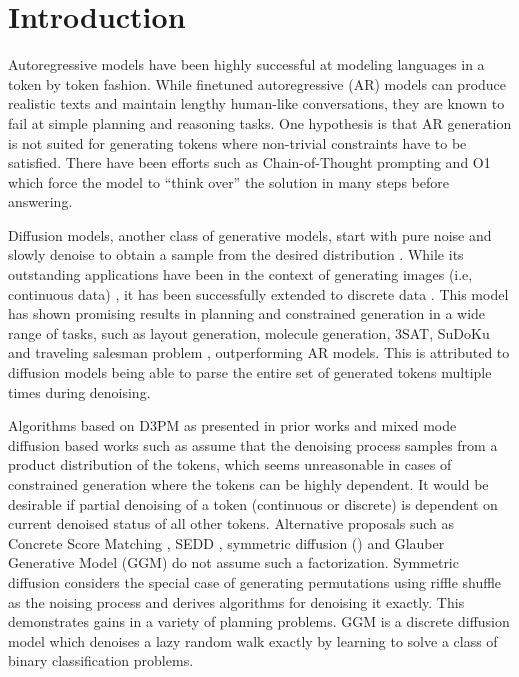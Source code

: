 \section{Introduction}
Autoregressive models have been highly successful at modeling languages in a token by token fashion. While finetuned autoregressive (AR) models can produce realistic texts and maintain lengthy human-like conversations, they are known to fail at simple planning and reasoning tasks. One hypothesis is that AR generation is not suited for generating tokens where non-trivial constraints have to be satisfied. There have been efforts such as Chain-of-Thought prompting \cite{wei2022chain} and O1 \cite{o1model} which force the model to ``think over'' the solution in many steps before answering.

Diffusion models, another class of generative models, start with pure noise and slowly denoise to obtain a sample from the desired distribution \cite{ho2020denoising,song2020score}. While its outstanding applications have been in the context of generating images (i.e, continuous data) \cite{saharia2022photorealistic,rombach2022high}, it has been successfully extended to discrete data \cite{austin2021structured,lou2023discrete}. This model has shown promising results in planning and constrained generation in a wide range of tasks, such as layout generation, molecule generation, 3SAT, SuDoKu \cite{ye2024autoregressiondiscretediffusioncomplex} and traveling salesman problem \cite{zhang2024symmetricdiffusers}, outperforming AR models. This is attributed to diffusion models being able to parse the entire set of generated tokens multiple times during denoising. 

Algorithms based on D3PM \cite{austin2021structured} as presented in prior works \cite{inoue2023layoutdm,ye2024autoregressiondiscretediffusioncomplex} and mixed mode diffusion based works such as \cite{hua2024mudiff} assume that the denoising process samples from a product distribution of the tokens, which seems unreasonable in cases of constrained generation where the tokens can be highly dependent. It would be desirable if partial denoising of a token (continuous or discrete) is dependent on current denoised status of all other tokens. Alternative proposals such as Concrete Score Matching \cite{meng2022concrete}, SEDD \cite{lou2023discrete}, symmetric diffusion (\cite{zhang2024symmetricdiffusers}) and Glauber Generative Model (GGM) \cite{varma2024glauber} do not assume such a factorization. Symmetric diffusion considers the special case of generating permutations using riffle shuffle as the noising process and derives algorithms for denoising it exactly. This demonstrates gains in a variety of planning problems. GGM is a discrete diffusion model which denoises a lazy random walk exactly by learning to solve a class of binary classification problems.

